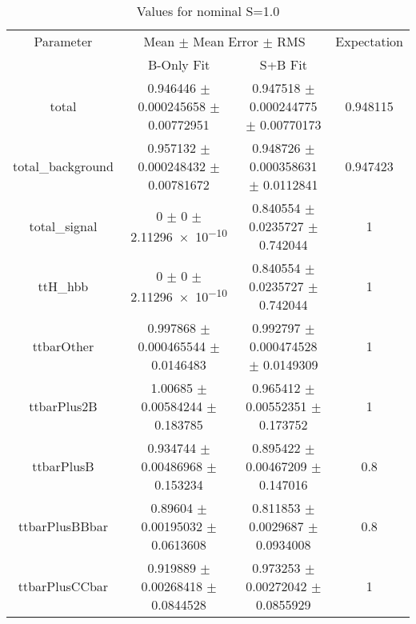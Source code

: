 \begin{table}
\centering
\caption{Values for nominal S=1.0}
\begin{tabular}{cccc}
\toprule
Parameter & \multicolumn{2}{c}{Mean $\pm$ Mean Error $\pm$ RMS} & Expectation\\
 & B-Only Fit & S+B Fit & \\
\midrule
total & \num{0.946446} $\pm$ \num{0.000245658} $\pm$ \num{0.00772951} & \num{0.947518} $\pm$ \num{0.000244775} $\pm$ \num{0.00770173} & \num{0.948115}\\
total\_background & \num{0.957132} $\pm$ \num{0.000248432} $\pm$ \num{0.00781672} & \num{0.948726} $\pm$ \num{0.000358631} $\pm$ \num{0.0112841} & \num{0.947423}\\
total\_signal & \num{0} $\pm$ \num{0} $\pm$ \num{2.11296e-10} & \num{0.840554} $\pm$ \num{0.0235727} $\pm$ \num{0.742044} & \num{1}\\
ttH\_hbb & \num{0} $\pm$ \num{0} $\pm$ \num{2.11296e-10} & \num{0.840554} $\pm$ \num{0.0235727} $\pm$ \num{0.742044} & \num{1}\\
ttbarOther & \num{0.997868} $\pm$ \num{0.000465544} $\pm$ \num{0.0146483} & \num{0.992797} $\pm$ \num{0.000474528} $\pm$ \num{0.0149309} & \num{1}\\
ttbarPlus2B & \num{1.00685} $\pm$ \num{0.00584244} $\pm$ \num{0.183785} & \num{0.965412} $\pm$ \num{0.00552351} $\pm$ \num{0.173752} & \num{1}\\
ttbarPlusB & \num{0.934744} $\pm$ \num{0.00486968} $\pm$ \num{0.153234} & \num{0.895422} $\pm$ \num{0.00467209} $\pm$ \num{0.147016} & \num{0.8}\\
ttbarPlusBBbar & \num{0.89604} $\pm$ \num{0.00195032} $\pm$ \num{0.0613608} & \num{0.811853} $\pm$ \num{0.0029687} $\pm$ \num{0.0934008} & \num{0.8}\\
ttbarPlusCCbar & \num{0.919889} $\pm$ \num{0.00268418} $\pm$ \num{0.0844528} & \num{0.973253} $\pm$ \num{0.00272042} $\pm$ \num{0.0855929} & \num{1}\\
\bottomrule
\end{tabular}
\end{table}